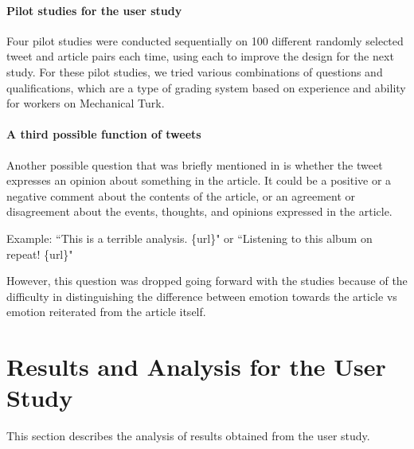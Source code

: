 \paragraph{Pilot studies for the user study} Four pilot studies were conducted sequentially on 100 different randomly selected tweet and article pairs each time, using each to improve the design for the next study. For these pilot studies, we tried various combinations of questions and qualifications, which are a type of grading system based on experience and ability for workers on Mechanical Turk.
 
\paragraph{A third possible function of tweets} Another possible question that was briefly mentioned in  is whether the tweet expresses an opinion about something in the article. It could be a positive or a negative comment about the contents of the article, or an agreement or disagreement about the events, thoughts, and opinions expressed in the article. 

Example: ``This is a terrible analysis. \{url\}" or ``Listening to this album on repeat! \{url\}"


However, this question was dropped going forward with the studies because of the difficulty in distinguishing the difference between emotion towards the article vs emotion reiterated from the article itself.


\section{Results and Analysis for the User Study}

This section describes the analysis of results obtained from the user study.


